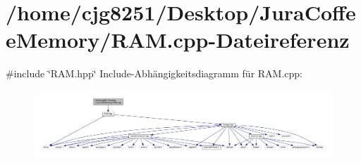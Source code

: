 \section{/home/cjg8251/\+Desktop/\+Jura\+Coffee\+Memory/\+R\+AM.cpp-\/\+Dateireferenz}
\label{_r_a_m_8cpp}
{\ttfamily \#include \char`\"{}R\+A\+M.\+hpp\char`\"{}}\newline
Include-\/\+Abhängigkeitsdiagramm für R\+A\+M.\+cpp\+:
\nopagebreak
\begin{figure}[H]
\begin{center}
\leavevmode
\includegraphics[width=350pt]{_r_a_m_8cpp__incl}
\end{center}
\end{figure}
